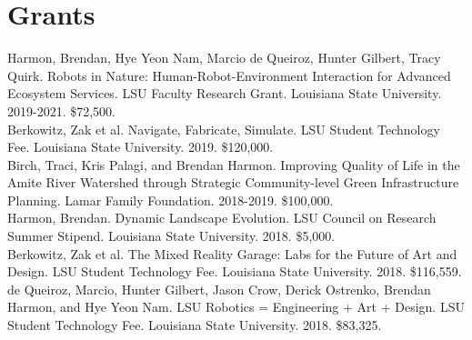 \documentclass[]{baharmon_cv}
\begin{document}
%

\sectiondivider


\section{Grants} 

Harmon, Brendan, Hye Yeon Nam, Marcio de Queiroz, Hunter Gilbert, Tracy Quirk. Robots in Nature: Human-Robot-Environment Interaction for Advanced Ecosystem Services. LSU Faculty Research Grant. Louisiana State University. 2019-2021. \$72,500.\\

Berkowitz, Zak et al. Navigate, Fabricate, Simulate. LSU Student Technology Fee. Louisiana State University. 2019.	\$120,000.\\

Birch, Traci, Kris Palagi, and Brendan Harmon. Improving Quality of Life in the Amite River Watershed through Strategic Community-level Green Infrastructure Planning. Lamar Family Foundation. 2018-2019. \$100,000.\\

Harmon, Brendan. Dynamic Landscape Evolution. LSU Council on Research Summer Stipend. Louisiana State University. 2018. \$5,000.\\

Berkowitz, Zak et al. The Mixed Reality Garage: Labs for the Future of Art and Design. LSU Student Technology Fee. Louisiana State University. 2018. \$116,559.\\

de Queiroz, Marcio, Hunter Gilbert, Jason Crow, Derick Ostrenko, Brendan Harmon, and Hye Yeon Nam. LSU Robotics = Engineering + Art + Design. LSU Student Technology Fee. Louisiana State University. 2018. \$83,325.\\
\end{document}
